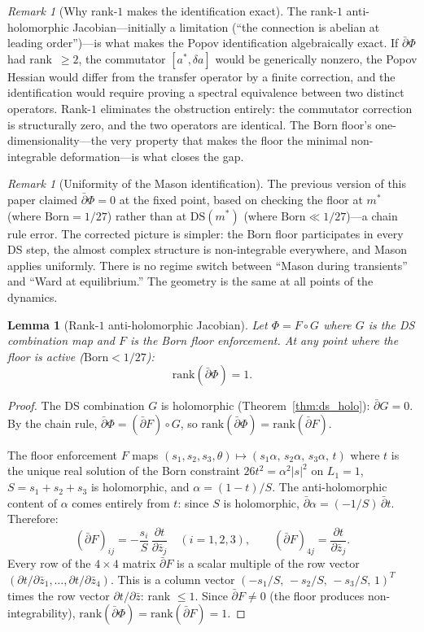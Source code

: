 \documentclass[11pt,a4paper]{article}
\newtheorem{lemma}[theorem]{Lemma}
\theoremstyle{definition}
\theoremstyle{remark}
\newtheorem{remark}[theorem]{Remark}
\newcommand{\dbar}{\bar{\partial}}
\begin{document}
\begin{remark}[Why rank-$1$ makes the identification exact]
The rank-$1$ anti-holomorphic Jacobian---initially a limitation (``the connection is abelian at leading order'')---is what makes the Popov identification algebraically exact. If $\dbar\Phi$ had rank~$\geq 2$, the commutator $[a^*,\delta a]$ would be generically nonzero, the Popov Hessian would differ from the transfer operator by a finite correction, and the identification would require proving a spectral equivalence between two distinct operators. Rank-$1$ eliminates the obstruction entirely: the commutator correction is structurally zero, and the two operators are identical. The Born floor's one-dimensionality---the very property that makes the floor the minimal non-integrable deformation---is what closes the gap.
\end{remark}

\begin{remark}[Uniformity of the Mason identification]\label{rem:mason_uniform}
The previous version of this paper claimed $\dbar\Phi=0$ at the fixed point, based on checking the floor at $m^*$ (where $\mathrm{Born}=1/27$) rather than at $\mathrm{DS}(m^*)$ (where $\mathrm{Born}\ll 1/27$)---a chain rule error. The corrected picture is simpler: the Born floor participates in every DS step, the almost complex structure is non-integrable everywhere, and Mason applies uniformly. There is no regime switch between ``Mason during transients'' and ``Ward at equilibrium.'' The geometry is the same at all points of the dynamics.
\end{remark}

\begin{lemma}[Rank-$1$ anti-holomorphic Jacobian]\label{lem:rank1}
Let $\Phi=F\circ G$ where $G$ is the DS combination map and $F$ is the Born floor enforcement. At any point where the floor is active ($\mathrm{Born}<1/27$):
\[
\mathrm{rank}(\dbar\Phi)=1.
\]
\end{lemma}

\begin{proof}
The DS combination $G$ is holomorphic (Theorem~\ref{thm:ds_holo}): $\dbar G=0$. By the chain rule, $\dbar\Phi=(\dbar F)\circ G$, so $\mathrm{rank}(\dbar\Phi)=\mathrm{rank}(\dbar F)$.

The floor enforcement $F$ maps $(s_1,s_2,s_3,\theta)\mapsto(s_1\alpha,\,s_2\alpha,\,s_3\alpha,\,t)$ where $t$ is the unique real solution of the Born constraint $26t^2=\alpha^2|s|^2$ on $L_1=1$, $S=s_1+s_2+s_3$ is holomorphic, and $\alpha=(1-t)/S$. The anti-holomorphic content of $\alpha$ comes entirely from $t$: since $S$ is holomorphic, $\dbar\alpha=(-1/S)\,\dbar t$. Therefore:
\[
(\dbar F)_{ij}=-\frac{s_i}{S}\,\frac{\partial t}{\partial\bar{z}_j}\quad(i=1,2,3),\qquad (\dbar F)_{4j}=\frac{\partial t}{\partial\bar{z}_j}.
\]
Every row of the $4\times 4$ matrix $\dbar F$ is a scalar multiple of the row vector $(\partial t/\partial\bar{z}_1,\ldots,\partial t/\partial\bar{z}_4)$. This is a column vector $(-s_1/S,\,-s_2/S,\,-s_3/S,\,1)^T$ times the row vector $\partial t/\partial\bar{z}$: rank $\leq 1$. Since $\dbar F\neq 0$ (the floor produces non-integrability), $\mathrm{rank}(\dbar\Phi)=\mathrm{rank}(\dbar F)=1$.
\end{proof}
\end{document}

